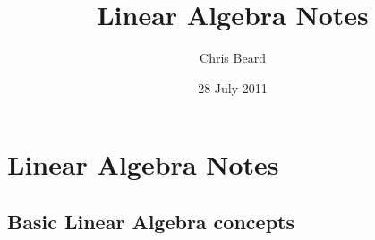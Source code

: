 \documentclass[10pt,letterpaper]{article}
\begin{document}
\title{Linear Algebra Notes}
\author{Chris Beard}
\date{28 July 2011}
\maketitle

\setcounter{tocdepth}{3}
\tableofcontents
\vspace*{1cm}


\section{Linear Algebra Notes}
\label{sec-1}
\subsection{Basic Linear Algebra concepts}
\label{sec-1_1}
\end{document}
